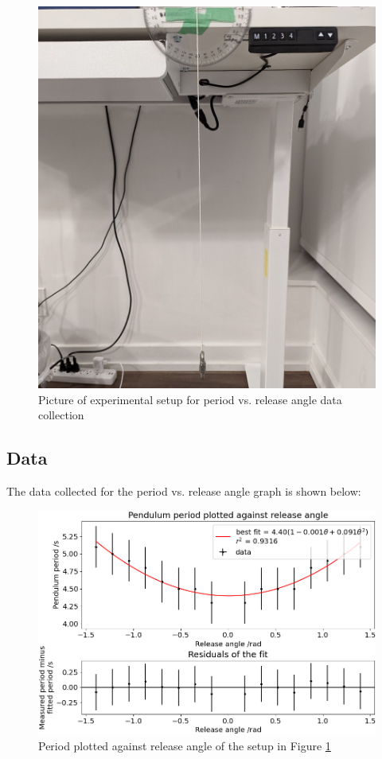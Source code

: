 \documentclass[11pt]{article}
\begin{document}
\begin{multicols}{2}
\begin{figure}[H]
    \centering
    \includegraphics[width=\linewidth]{../figures/exp_setup1.jpg}
    \caption{\centering Picture of experimental setup for period vs. release angle data collection}
    \label{fig:figure 1}
\end{figure}


\subsection{Data} \label{sec 3.2 Data}
The data collected for the period vs. release angle graph is shown below:

\begin{figure}[H]
    \centering
    \includegraphics[width=\linewidth]{../figures/period_vs_release_angle.png}
    \caption{\centering Period plotted against release angle of the setup in Figure \ref{fig:figure 1}}
    \label{fig:figure 2}
\end{figure}


\end{multicols}
\end{document}
